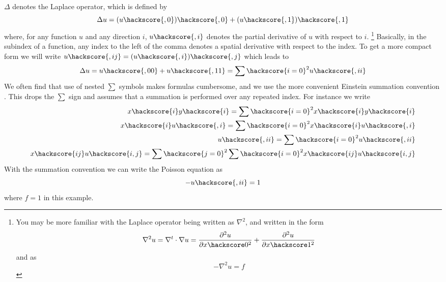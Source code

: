 $\Delta$ denotes the Laplace operator, which is defined by
\begin{equation}
\Delta u = (u\hackscore {,0})\hackscore{,0}+(u\hackscore{,1})\hackscore{,1}
\label{eq:FirstSteps.1.1}
\end{equation}
where, for any function $u$ and any direction $i$, $u\hackscore{,i}$
denotes the partial derivative  of $u$ with respect to $i$.  
\footnote{You
may be more familiar with the Laplace operator being written
as $\nabla^2$, and written in the form
\begin{equation*}
\nabla^2 u = \nabla^t \cdot \nabla u =  \frac{\partial^2 u}{\partial x\hackscore 0^2} 
+ \frac{\partial^2 u}{\partial  x\hackscore 1^2}
\end{equation*}
and  as
\begin{equation*}
-\nabla^2 u = f
\end{equation*}
}
Basically, in the subindex of a function, any index to the left of the comma denotes a spatial derivative with respect 
to the index. To get a more compact form we will write $u\hackscore{,ij}=(u\hackscore {,i})\hackscore{,j}$
which leads to
\begin{equation}
\Delta u = u\hackscore{,00}+u\hackscore{,11}=\sum\hackscore{i=0}^2 u\hackscore{,ii}
\label{eq:FirstSteps.1.1b}
\end{equation}
We often find that use
of nested $\sum$ symbols makes formulas cumbersome, and we use the more
convenient Einstein summation convention . This 
drops the $\sum$ sign and assumes that a summation is performed over any repeated index.
For instance we write
\begin{eqnarray}
x\hackscore{i}y\hackscore{i}=\sum\hackscore{i=0}^2 x\hackscore{i}y\hackscore{i}   \\
x\hackscore{i}u\hackscore{,i}=\sum\hackscore{i=0}^2 x\hackscore{i}u\hackscore{,i}   \\
u\hackscore{,ii}=\sum\hackscore{i=0}^2 u\hackscore{,ii} \\
x\hackscore{ij}u\hackscore{i,j}=\sum\hackscore{j=0}^2\sum\hackscore{i=0}^2 x\hackscore{ij}u\hackscore{i,j}   \\
\label{eq:FirstSteps.1.1c}
\end{eqnarray}
With the summation convention we can write the Poisson equation  as
\begin{equation}
- u\hackscore{,ii} =1 
\label{eq:FirstSteps.1.sum}
\end{equation}
where $f=1$ in this example.

